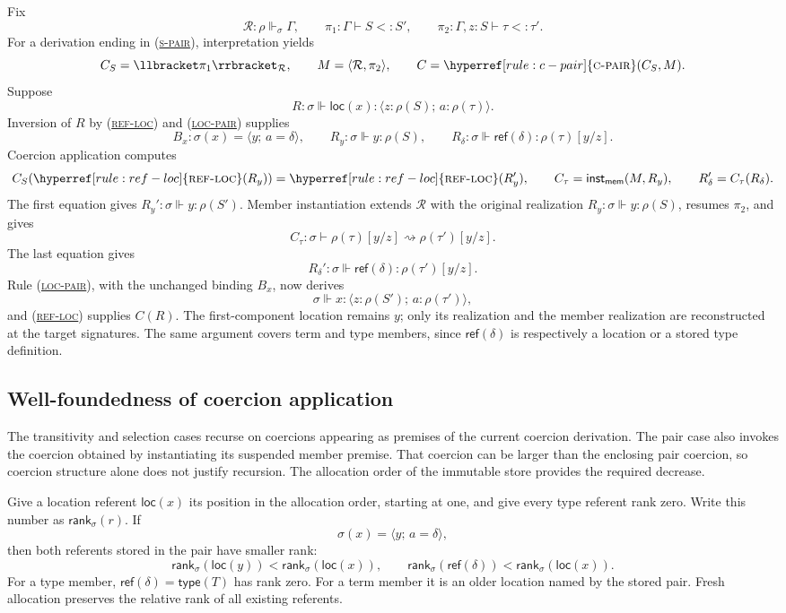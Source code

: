 \documentclass[acmsmall,screen,nonacm]{acmart}
\newcommand{\ruleuse}[1]{%
  \hyperref[rule:#1]{\textsc{#1}}}
\newcommand{\ruleref}[1]{%
  \textsc{(\hyperref[rule:#1]{#1})}}
\newcommand{\pairty}[4]{\langle #1\!:\!#2;\,#3\!:\!#4\rangle}
\newcommand{\pairval}[3]{\langle #1;\,#2=#3\rangle}
\newcommand{\subst}[3]{#1[#2/#3]}
\newcommand{\loc}[1]{\mathsf{loc}(#1)}
\newcommand{\typeref}[1]{\mathsf{type}(#1)}
\newcommand{\referentof}[1]{\mathsf{ref}(#1)}
\newcommand{\realizes}{\Vdash}
\newcommand{\coerce}{\mathrel{\rightsquigarrow}}
\newcommand{\compilepi}[2]{\llbracket #2\rrbracket_{#1}}
\newcommand{\action}[2]{#1(#2)}
\newcommand{\forcemem}[2]{\mathsf{inst}_{\mathsf{mem}}(#1,#2)}
\newcommand{\closure}[3]{\langle #1,#2\rangle}
\begin{document}
Fix
\[
  \mathcal R:\rho\realizes_\sigma\Gamma,
  \qquad
  \pi_1:\Gamma\vdash S<:S',
  \qquad
  \pi_2:\Gamma,z:S\vdash\tau<:\tau'.
\]
For a derivation ending in \ruleref{s-pair}, interpretation yields
\[
  C_S=\compilepi{\mathcal R}{\pi_1},
  \qquad
  M=\closure{\mathcal R}{\pi_2}{mem},
  \qquad
  C=\ruleuse{c-pair}(C_S,M).
\]
Suppose
\[
  R:\sigma\realizes\loc x:
    \pairty{z}{\rho(S)}{a}{\rho(\tau)}.
\]
Inversion of \(R\) by \ruleref{ref-loc} and \ruleref{loc-pair} supplies
\[
  B_x:\sigma(x)=\pairval{y}{a}{\delta},
  \qquad
  R_y:\sigma\realizes y:\rho(S),
  \qquad
  R_\delta:\sigma\realizes\referentof{\delta}:
    \subst{\rho(\tau)}{y}{z}.
\]
Coercion application computes
\[
  \action{C_S}{\ruleuse{ref-loc}(R_y)}=\ruleuse{ref-loc}(R_y'),
  \qquad
  C_\tau=\forcemem{M}{R_y},
  \qquad
  R_\delta'=\action{C_\tau}{R_\delta}.
\]
The first equation gives
\(R_y':\sigma\realizes y:\rho(S')\). Member instantiation extends
\(\mathcal R\) with the original realization
\(R_y:\sigma\realizes y:\rho(S)\), resumes \(\pi_2\), and gives
\[
  C_\tau:\sigma\vdash
  \subst{\rho(\tau)}{y}{z}\coerce
  \subst{\rho(\tau')}{y}{z}.
\]
The last equation gives
\[
  R_\delta':\sigma\realizes\referentof{\delta}:
    \subst{\rho(\tau')}{y}{z}.
\]
Rule \ruleref{loc-pair}, with the unchanged binding \(B_x\), now derives
\[
  \sigma\realizes x:
    \pairty{z}{\rho(S')}{a}{\rho(\tau')},
\]
and \ruleref{ref-loc} supplies \(\action{C}{R}\). The first-component
location remains \(y\); only its realization and the member realization are
reconstructed at the target signatures. The same argument covers term and
type members, since \(\referentof{\delta}\) is respectively a location or a
stored type definition.

\subsection{Well-foundedness of coercion application}
\label{sec:coercion-termination}

The transitivity and selection cases recurse on coercions appearing as
premises of the current coercion derivation. The pair case also invokes the coercion obtained by
instantiating its suspended member premise. That coercion can be larger than
the enclosing pair coercion, so coercion structure alone does not justify
recursion. The allocation order of the immutable store provides the required
decrease.

Give a location referent \(\loc{x}\) its position in the allocation order,
starting at one, and give every type referent rank zero. Write this number as
\(\mathsf{rank}_\sigma(r)\). If
\[
  \sigma(x)=\pairval{y}{a}{\delta},
\]
then both referents stored in the pair have smaller rank:
\[
  \mathsf{rank}_\sigma(\loc y)
    <\mathsf{rank}_\sigma(\loc x),
  \qquad
  \mathsf{rank}_\sigma(\referentof{\delta})
    <\mathsf{rank}_\sigma(\loc x).
\]
For a type member, \(\referentof{\delta}=\typeref{T}\) has rank zero. For a
term member it is an older location named by the stored pair.
Fresh allocation preserves the relative rank of all existing referents.
\end{document}

